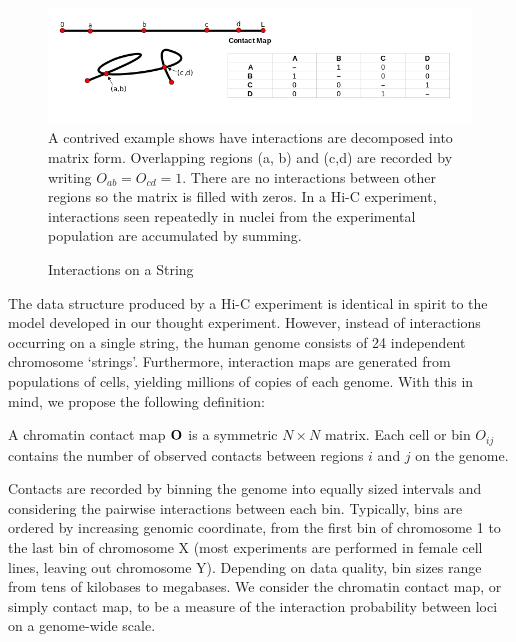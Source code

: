 \begin{figure}[H]
  \centering
  \caption[Interactions on a String]{Interactions on a String}\label{fig:string}
  \includegraphics[width=\textwidth]{figures/mathematics/strmtx2}
  \medskip
  \small
  A contrived example shows have interactions are decomposed into matrix form.  Overlapping regions (a, b) and
  (c,d) are recorded by writing $O_{ab} = O_{cd} = 1$.  There are no interactions between other regions so the
  matrix is filled with zeros.  In a Hi-C experiment, interactions seen repeatedly in nuclei from the experimental
  population are accumulated by summing.
\end{figure}

The data structure produced by a Hi-C experiment is identical in spirit to the model developed in our thought experiment.  However, instead of
interactions occurring on a single string, the human genome consists of 24 independent chromosome `strings'.  Furthermore, interaction maps are
generated from populations of cells, yielding millions of copies of each genome.  With this in mind, we propose the following definition:

\begin{defn}
  A chromatin contact map $\mathbf{O}$ is a symmetric $N \times N$ matrix.  Each cell or bin $O_{ij}$ contains the number of observed contacts
  between regions $i$ and $j$ on the genome.
\end{defn}

Contacts are recorded by binning the genome into equally sized intervals and considering the pairwise interactions between each bin.
Typically, bins are ordered by increasing genomic coordinate, from the first bin of chromosome 1 to the last bin of chromosome X (most
experiments are performed in female cell lines, leaving out chromosome Y).  Depending on data quality, bin sizes range from tens of
kilobases to megabases.  We consider the chromatin contact map, or simply contact map, to be a measure of the interaction probability between
loci on a genome-wide scale.

